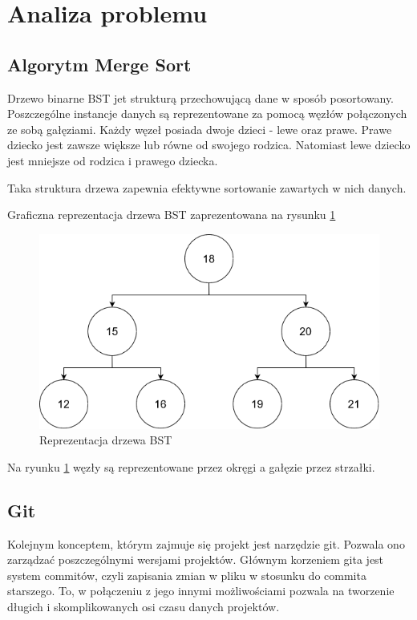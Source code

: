 \newpage
\section{Analiza problemu}		%

\subsection{Algorytm Merge Sort}

Drzewo binarne BST\cite{bstwiki} jet strukturą przechowującą dane w sposób posortowany. Poszczególne instancje danych są reprezentowane za pomocą węzłów połączonych ze sobą gałęziami. Każdy węzeł posiada dwoje dzieci - lewe oraz prawe. Prawe dziecko jest zawsze większe lub równe od swojego rodzica. Natomiast lewe dziecko jest mniejsze od rodzica i prawego dziecka.

Taka struktura drzewa zapewnia efektywne sortowanie zawartych w nich danych.

Graficzna reprezentacja drzewa BST zaprezentowana na rysunku \ref{fig:treegraphic}

\begin{figure}[H]
	\centering
	\includegraphics[width=0.7\linewidth]{images/DiagramBTS}
	\caption{Reprezentacja drzewa BST}
	\label{fig:treegraphic}
\end{figure}

Na ryunku \ref{fig:treegraphic} węzły są reprezentowane przez okręgi a gałęzie przez strzałki.


\subsection{Git}
Kolejnym konceptem, którym zajmuje się projekt jest narzędzie git\cite{gitsite}. Pozwala ono zarządzać poszczególnymi wersjami projektów. Głównym korzeniem gita jest system commitów, czyli zapisania zmian w pliku w stosunku do commita starszego. To, w połączeniu z jego innymi możliwościami pozwala na tworzenie długich i skomplikowanych osi czasu danych projektów. 

